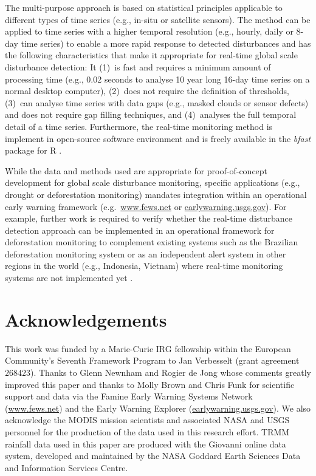 \documentclass[authoryear,preprint,review,10pt]{elsarticle}
\begin{document}
The multi-purpose approach is based on statistical principles applicable to different types of time series (e.g., in-situ or satellite sensors). The method can be applied to time series with a higher temporal resolution (e.g., hourly, daily or 8-day time series) to enable a more rapid response to detected disturbances and has the following characteristics that make it appropriate for real-time global scale disturbance detection: 
It (1)~is fast and requires a minimum amount of processing time (e.g., 0.02 seconds to analyse 10 year long 16-day time series  on a normal desktop computer),
(2)~does not require the definition of thresholds, (3)~can analyse time series with data gaps (e.g., masked clouds or sensor defects) and does not require gap filling techniques, and (4)~analyses the full temporal detail of a time series. Furthermore, the real-time monitoring method is implement in open-source software environment and is freely available in the \emph{bfast} package for {R} \citep{R}.

While the data and methods used are appropriate for proof-of-concept development for global scale disturbance monitoring, specific applications (e.g., drought or deforestation monitoring) mandates integration within an operational early warning framework (e.g.\ \url{www.fews.net} or \url{earlywarning.usgs.gov}). For example, further work is required to verify whether the real-time disturbance detection approach can be implemented in an operational
framework for deforestation monitoring to complement existing systems such as the Brazilian deforestation monitoring system
\citep{Shimabukuro:2006vb, Souza:2005gl,Asner:2009wa} or as an independent alert system in other regions in the world (e.g., Indonesia, Vietnam)
where real-time monitoring systems are not implemented yet \citep{Asner:2011fa}. 

\section{Acknowledgements}

This work was funded by a Marie-Curie IRG fellowship within the European Community's Seventh Framework Program to Jan Verbesselt (grant agreement $268423$). Thanks to Glenn Newnham and Rogier de Jong whose comments greatly improved this paper and thanks to Molly Brown and Chris Funk for scientific support and data via the Famine Early Warning Systems Network (\url{www.fews.net}) and the Early Warning Explorer (\url{earlywarning.usgs.gov}).
We also acknowledge the MODIS mission scientists and associated NASA and USGS personnel for the production of the data used in this research effort. TRMM rainfall data used in this paper are produced with the Giovanni online data system, developed and maintained by the NASA Goddard Earth Sciences Data and Information Services Centre.
\end{document}
